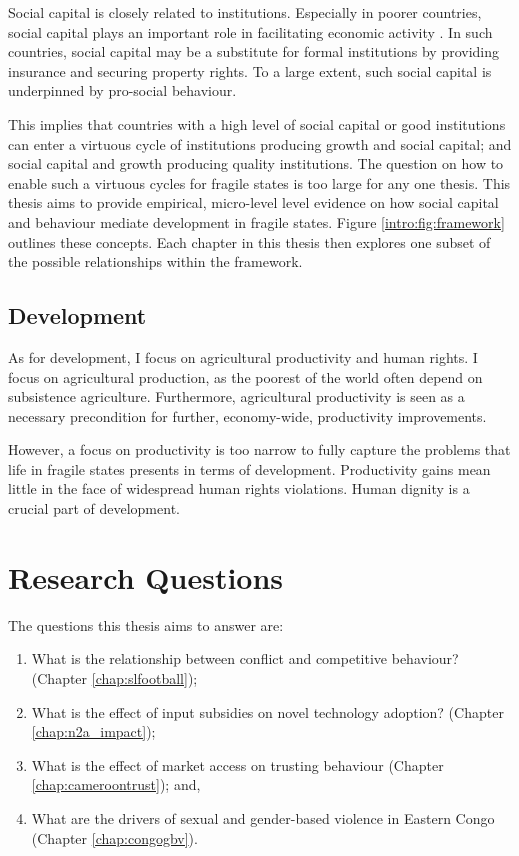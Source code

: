 %
Social capital is closely related to institutions.  Especially in poorer countries, social capital plays an important role in facilitating economic activity \citep{Knack1997}. In such countries, social capital may be a substitute for formal institutions by providing insurance and securing property rights. To a large extent, such social capital is underpinned by pro-social behaviour. 

This implies that countries with a high level of social capital or good institutions can enter a virtuous cycle of institutions producing growth and social capital; and social capital and growth producing quality institutions. The question on how to enable such a virtuous cycles for fragile states is too large for any one thesis. This thesis aims to provide empirical, micro-level level evidence on how social capital and behaviour mediate development in fragile states. Figure \ref{intro:fig:framework} outlines these concepts. Each chapter in this thesis then explores one subset of the possible relationships within the framework.

\subsection{Development}
As for development, I focus on agricultural productivity and human rights. I focus on agricultural production, as the poorest of the world often depend on subsistence agriculture. Furthermore, agricultural productivity is seen as a necessary precondition for further, economy-wide, productivity improvements.  

However, a focus on productivity is too narrow to fully capture the problems that life in fragile states presents in terms of development. Productivity gains mean little in the face of widespread human rights violations. Human dignity is a crucial part of development.


\section{Research Questions}
The questions this thesis aims to answer are:
\begin{enumerate}
	\item What is the relationship between conflict and competitive behaviour? (Chapter \ref{chap:slfootball});
	\item What is the effect of input subsidies on novel technology adoption? (Chapter \ref{chap:n2a_impact});
	\item What is the effect of market access on trusting behaviour (Chapter \ref{chap:cameroontrust}); and,
	\item What are the drivers of sexual and gender-based violence in Eastern Congo (Chapter \ref{chap:congogbv}).
\end{enumerate}

